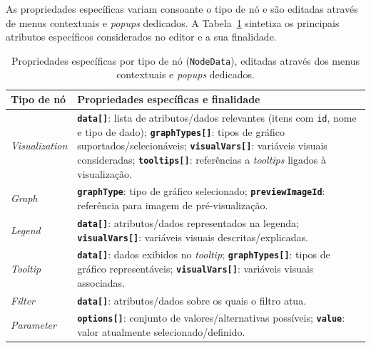 As propriedades específicas variam consoante o tipo de nó e são editadas através de menus contextuais e \textit{popups} dedicados. A Tabela~\ref{tab:node_specific_props} sintetiza os principais atributos específicos considerados no editor e a sua finalidade.

\begin{table}[htbp]
\centering
\caption{Propriedades específicas por tipo de nó (\texttt{NodeData}), editadas através dos menus contextuais e \textit{popups} dedicados.}
\label{tab:node_specific_props}
\begin{tabularx}{\textwidth}{@{}lX@{}}
\toprule
\textbf{Tipo de nó} & \textbf{Propriedades específicas e finalidade} \\
\midrule

\textit{Visualization} &
\textbf{\texttt{data[]}}: lista de atributos/dados relevantes (itens com \texttt{id}, nome e tipo de dado); \newline
\textbf{\texttt{graphTypes[]}}: tipos de gráfico suportados/selecionáveis; \newline
\textbf{\texttt{visualVars[]}}: variáveis visuais consideradas; \newline
\textbf{\texttt{tooltips[]}}: referências a \textit{tooltips} ligados à visualização. \\

\textit{Graph} &
\textbf{\texttt{graphType}}: tipo de gráfico selecionado; \newline
\textbf{\texttt{previewImageId}}: referência para imagem de pré-visualização. \\

\textit{Legend} &
\textbf{\texttt{data[]}}: atributos/dados representados na legenda; \newline
\textbf{\texttt{visualVars[]}}: variáveis visuais descritas/explicadas. \\

\textit{Tooltip} &
\textbf{\texttt{data[]}}: dados exibidos no \textit{tooltip}; \newline
\textbf{\texttt{graphTypes[]}}: tipos de gráfico representáveis; \newline
\textbf{\texttt{visualVars[]}}: variáveis visuais associadas. \\

\textit{Filter} &
\textbf{\texttt{data[]}}: atributos/dados sobre os quais o filtro atua. \\

\textit{Parameter} &
\textbf{\texttt{options[]}}: conjunto de valores/alternativas possíveis; \newline
\textbf{\texttt{value}}: valor atualmente selecionado/definido. \\

\bottomrule
\end{tabularx}
\end{table}

